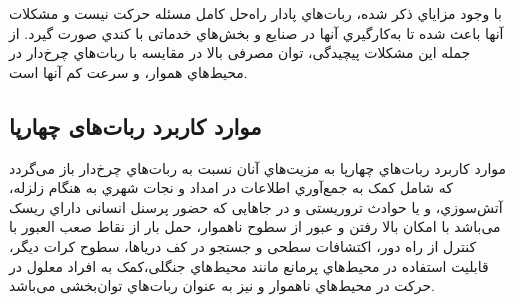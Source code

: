 با وجود مزایاي ذکر شده، ربات‌هاي پادار راه‌حل کامل مسئله حرکت نیست و مشكلات آنها باعث شده تا به‌كارگیري آنها در صنایع و بخش‌هاي خدماتی با کندي صورت گیرد. از جمله این مشكلات پیچیدگی، توان مصرفی بالا در مقایسه با ربات‌هاي چرخ‌دار در محیط‌هاي هموار، و سرعت کم آنها است.

\subsection{موارد کاربرد ربات‌های چهارپا}
موارد کاربرد ربات‌هاي چهارپا به مزیت‌هاي آنان نسبت به ربات‌هاي چرخ‌دار باز می‌گردد که شامل کمک به جمع‌آوري اطلاعات در امداد و نجات شهري به هنگام زلزله، آتش‌سوزي، و یا حوادث تروریستی و در جاهایی که حضور پرسنل انسانی داراي ریسک می‌باشد با امكان بالا رفتن و عبور از سطوح ناهموار، حمل بار از نقاط صعب العبور با کنترل از راه دور، اکتشافات سطحی و جستجو در کف دریاها، سطوح کرات
دیگر، قابلیت استفاده در محیط‌هاي پرمانع مانند محیط‌هاي جنگلی،کمک به افراد معلول در حرکت در محیط‌هاي ناهموار و نیز به عنوان ربات‌هاي توان‌بخشی می‌باشد\cite{Quadruped}.
\newpage
